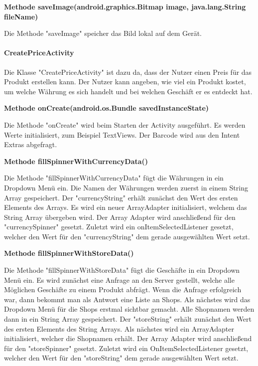 \documentclass{scrartcl}
\begin{document}
\noindent\textbf{Methode saveImage(android.graphics.Bitmap image, java.lang.String fileName)}

\noindent Die Methode "saveImage" speicher das Bild lokal auf dem Gerät. \newline

\newpage

\paragraph{CreatePriceActivity}
Die Klasse "CreatePriceActivity" ist dazu da, dass der Nutzer einen Preis für das Produkt erstellen kann. Der Nutzer kann angeben, wie viel ein Produkt kostet, um welche Währung es sich handelt und bei welchen Geschäft er es entdeckt hat. \newline 

\noindent\textbf{Methode onCreate(android.os.Bundle savedInstanceState)}

\noindent Die Methode "onCreate" wird beim Starten der Activity ausgeführt. Es werden Werte initialisiert, zum Beispiel TextViews. Der Barcode wird aus den Intent Extras abgefragt. \newline

\noindent\textbf{Methode fillSpinnerWithCurrencyData()}

\noindent Die Methode "fillSpinnerWithCurrencyData" fügt die Währungen in ein Dropdown Menü ein. Die Namen der Währungen werden zuerst in einem String Array gespeichert. Der "currencyString" erhält zunächst den Wert des ersten Elements des Arrays. Es wird ein neuer ArrayAdapter initialisiert, welchem das String Array übergeben wird. Der Array Adapter wird anschließend für den "currencySpinner" gesetzt. Zuletzt wird ein onItemSelectedListener gesetzt, welcher den Wert für den "currencyString" dem gerade ausgewählten Wert setzt. \newline

\noindent\textbf{Methode fillSpinnerWithStoreData()}

\noindent Die Methode "fillSpinnerWithStoreData" fügt die Geschäfte in ein Dropdown Menü ein. Es wird zunächst eine Anfrage an den Server gestellt, welche alle Möglichen Geschäfte zu einem Produkt abfrägt. Wenn die Anfrage erfolgreich war, dann bekommt man als Antwort eine Liste an Shops. Als nächstes wird das Dropdown Menü für die Shops erstmal sichtbar gemacht. Alle Shopnamen werden dann in ein String Array gespeichert. Der "storeString" erhält zunächst den Wert des ersten Elements des String Arrays. Als nächstes wird ein ArrayAdapter initialisiert, welcher die Shopnamen erhält. Der Array Adapter wird anschließend für den "storeSpinner" gesetzt. Zuletzt wird ein OnItemSelectedListener gesetzt, welcher den Wert für den "storeString" dem gerade ausgewählten Wert setzt. \newline
\end{document}
